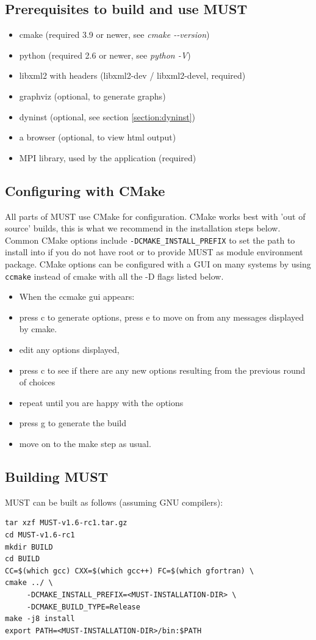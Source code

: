 \documentclass[english]{scrartcl}
\begin{document}
\subsection{Prerequisites to build and use MUST}
\begin{itemize}
 \item cmake (required 3.9 or newer, see \emph{cmake \mbox{-{}-version}})
 \item python (required 2.6 or newer, see \emph{python \mbox{-V}})
 \item libxml2 with headers (libxml2-dev / libxml2-devel, required)
 \item graphviz (optional, to generate graphs)
 \item dyninst (optional, see section \ref{section:dyninst})
 \item a browser (optional, to view html output)
 \item MPI library, used by the application (required)
\end{itemize}
\subsection{Configuring with CMake}
All parts of MUST use CMake for configuration.
CMake works best with 'out of source' builds, this is what we recommend in
the installation steps below. 
Common CMake options include \verb|-DCMAKE_INSTALL_PREFIX| to set the path to
install into if you do not have root or to provide MUST as module environment package.
CMake options can be configured with a GUI on many systems by using
\verb|ccmake| instead of cmake with all the -D flags listed below.
\begin{itemize}
     \item When the ccmake gui appears:
     \item press c to generate options, press e to move on from any messages displayed by cmake. 
     \item edit any options displayed, 
     \item press c to see if there are any new options resulting from the previous round of choices
     \item repeat until you are happy with the options
     \item press g to generate the build
     \item move on to the make step as usual.
\end{itemize}
\subsection{Building MUST}
MUST can be built as follows (assuming GNU compilers):
\begin{verbatim}
tar xzf MUST-v1.6-rc1.tar.gz
cd MUST-v1.6-rc1
mkdir BUILD
cd BUILD
CC=$(which gcc) CXX=$(which gcc++) FC=$(which gfortran) \
cmake ../ \
     -DCMAKE_INSTALL_PREFIX=<MUST-INSTALLATION-DIR> \
     -DCMAKE_BUILD_TYPE=Release
make -j8 install
export PATH=<MUST-INSTALLATION-DIR>/bin:$PATH
\end{verbatim}
\end{document}
